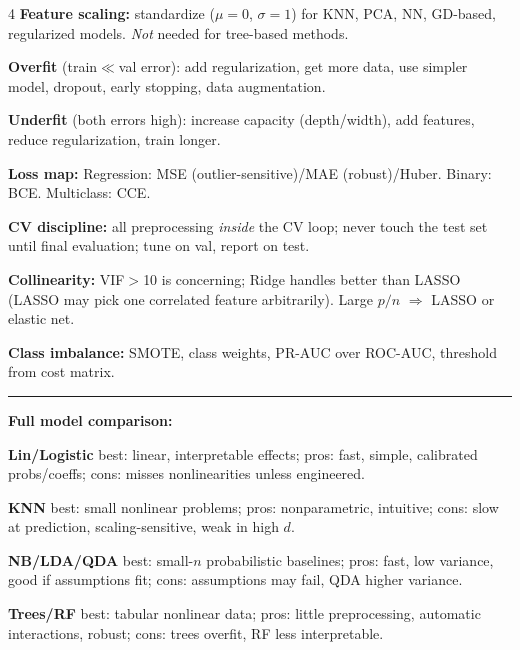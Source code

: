 \documentclass[6.5pt,landscape]{article}
\makeatletter
\renewcommand{\section}{\@startsection{section}{1}{\z@}{0.3ex plus 0.05ex}{0.05ex}{\normalfont\scriptsize\bfseries\itshape}}
\newcommand{\rl}{\vspace{-1.5pt}\par\noindent\rule{\columnwidth}{0.15pt}\par\vspace{-1pt}}
\makeatother
\begin{document}
\begin{multicols*}{4}
\section{Practical Reference}
\noindent\textbf{Feature scaling:} standardize ($\mu{=}0$, $\sigma{=}1$) for KNN, PCA, NN, GD-based, regularized models. \emph{Not} needed for tree-based methods.\par
\textbf{Overfit} (train$\ll$val error): add regularization, get more data, use simpler model, dropout, early stopping, data augmentation.\par
\textbf{Underfit} (both errors high): increase capacity (depth/width), add features, reduce regularization, train longer.\par
\textbf{Loss map:} Regression: MSE (outlier-sensitive)/MAE (robust)/Huber. Binary: BCE. Multiclass: CCE.\par
\textbf{CV discipline:} all preprocessing \emph{inside} the CV loop; never touch the test set until final evaluation; tune on val, report on test.\par
\textbf{Collinearity:} VIF$>$10 is concerning; Ridge handles better than LASSO (LASSO may pick one correlated feature arbitrarily). Large $p/n$ $\Rightarrow$ LASSO or elastic net.\par
\textbf{Class imbalance:} SMOTE, class weights, PR-AUC over ROC-AUC, threshold from cost matrix.\par
\rl
{\setlength{\tabcolsep}{2pt}\renewcommand{\arraystretch}{0.9}
\noindent\textbf{Full model comparison:}\par
{\fontsize{4.3pt}{4.8pt}\selectfont
\textbf{Lin/Logistic}\hspace{0.4em}
best: linear, interpretable effects; pros: fast, simple, calibrated probs/coeffs; cons: misses nonlinearities unless engineered.\par
\textbf{KNN}\hspace{2.6em}
best: small nonlinear problems; pros: nonparametric, intuitive; cons: slow at prediction, scaling-sensitive, weak in high $d$.\par
\textbf{NB/LDA/QDA}\hspace{0.5em}
best: small-$n$ probabilistic baselines; pros: fast, low variance, good if assumptions fit; cons: assumptions may fail, QDA higher variance.\par
\textbf{Trees/RF}\hspace{1.7em}
best: tabular nonlinear data; pros: little preprocessing, automatic interactions, robust; cons: trees overfit, RF less interpretable.\par
}}
\end{multicols*}
\end{document}
